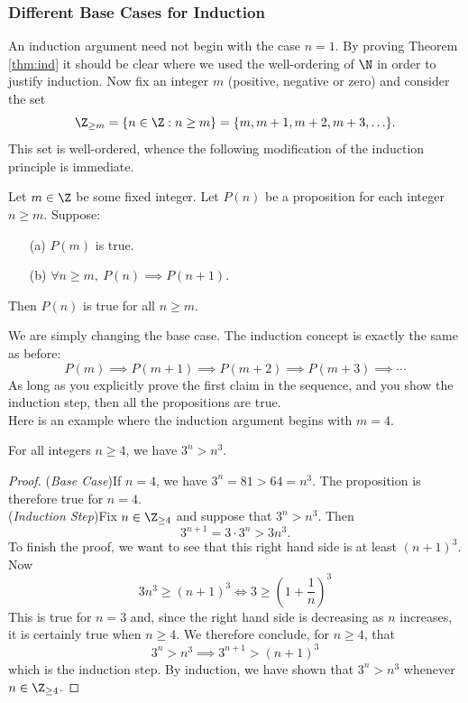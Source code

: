 \subsubsection*{Different Base Cases for Induction}

An induction argument need not begin with the case $n=1$. By proving Theorem \ref{thm:ind} it should be clear where we used the well-ordering of $\N$ in order to justify induction. Now fix an integer $m$ (positive, negative or zero) and consider the set
\[\Z_{\ge m}=\{n\in\Z:n\ge m\}=\{m,m+1,m+2,m+3,\ldots\}.\]
This set is well-ordered, whence the following modification of the induction principle is immediate.

\begin{cor}
Let $m\in\Z$ be some fixed integer. Let $P(n)$ be a proposition for each integer $n\ge m$. Suppose:
\begin{enumerate}
  \item[(a)] $P(m)$ is true.
  \item[(b)] $\forall n\ge m,\ P(n)\implies P(n+1)$.
\end{enumerate}
Then $P(n)$ is true for all $n\ge m$.
\end{cor}

\noindent We are simply changing the base case. The induction concept is exactly the same as before:
\[P(m)\implies P(m+1)\implies P(m+2)\implies P(m+3)\implies\cdots\]
As long as you explicitly prove the first claim in the sequence, and you show the induction step, then all the propositions are true.\\


Here is an example where the induction argument begins with $m=4$.

\begin{thm}
For all integers $n\ge 4$, we have $3^n>n^3$.
\end{thm}

\begin{proof}
(\emph{Base Case})\quad If $n=4$, we have $3^n=81>64=n^3$. The proposition is therefore true for $n=4$.\\
(\emph{Induction Step})\quad Fix $n\in\Z_{\ge 4}$ and suppose that $3^n>n^3$. Then
\[3^{n+1}=3\cdot 3^n>3n^3.\]
To finish the proof, we want to see that this right hand side is at least $(n+1)^3$. Now
\[3n^3\ge(n+1)^3\iff 3\ge\left(1+\frac 1n\right)^3\]
This is true for $n=3$ and, since the right hand side is decreasing as $n$ increases, it is certainly true  when $n\ge 4$. We therefore conclude, for $n\ge 4$, that
\[3^n>n^3\implies 3^{n+1}>(n+1)^3\]
which is the induction step. By induction, we have shown that $3^n>n^3$ whenever $n\in\Z_{\ge 4}$.
\end{proof}


